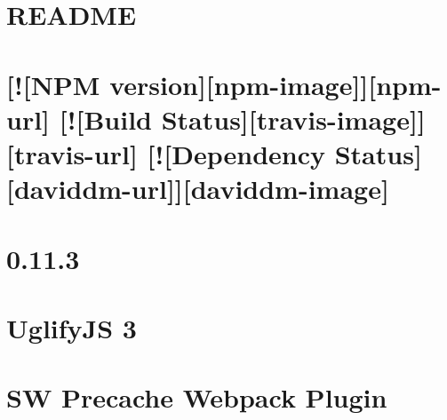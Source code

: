 \documentclass[twoside]{book}
\newcommand{\+}{\discretionary{\mbox{\scriptsize$\hookleftarrow$}}{}{}}
\begin{document}
\chapter{R\+E\+A\+D\+ME}
\label{md__c_1_workspace_demo_src_main_script_node_modules_svgo__r_e_a_d_m_e_8ru}

\chapter{\mbox{[}!\mbox{[}N\+PM version\mbox{]}\mbox{[}npm-\/image\mbox{]}\mbox{]}\mbox{[}npm-\/url\mbox{]} \mbox{[}!\mbox{[}Build Status\mbox{]}\mbox{[}travis-\/image\mbox{]}\mbox{]}\mbox{[}travis-\/url\mbox{]} \mbox{[}!\mbox{[}Dependency Status\mbox{]}\mbox{[}daviddm-\/url\mbox{]}\mbox{]}\mbox{[}daviddm-\/image\mbox{]}}
\label{md__c_1_workspace_demo_src_main_script_node_modules_sw-precache__r_e_a_d_m_e}

\chapter{0.11.3}
\label{md__c_1_workspace_demo_src_main_script_node_modules_sw-precache-webpack-plugin__c_h_a_n_g_e_l_o_g}

\chapter{Uglify\+JS 3}
\label{md__c_1_workspace_demo_src_main_script_node_modules_sw-precache-webpack-plugin_node_modules_uglify-js__r_e_a_d_m_e}

\chapter{SW Precache Webpack Plugin}
\label{md__c_1_workspace_demo_src_main_script_node_modules_sw-precache-webpack-plugin__r_e_a_d_m_e}

\end{document}
